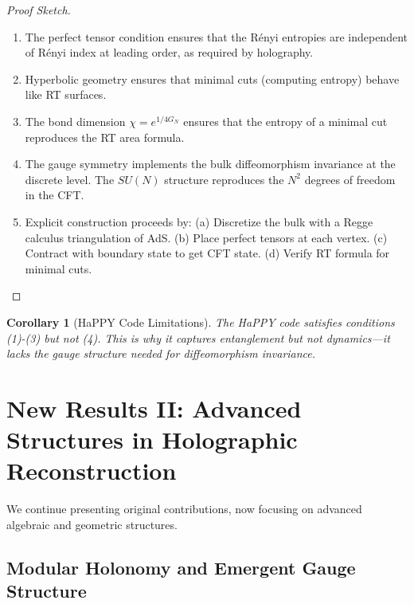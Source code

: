 \documentclass[12pt,a4paper]{article}
\newtheorem{corollary}[theorem]{Corollary}
\begin{document}
\begin{proof}[Proof Sketch]
\begin{enumerate}
    \item The perfect tensor condition ensures that the R\'enyi entropies are independent of R\'enyi index at leading order, as required by holography.
    
    \item Hyperbolic geometry ensures that minimal cuts (computing entropy) behave like RT surfaces.
    
    \item The bond dimension $\chi = e^{1/4G_N}$ ensures that the entropy of a minimal cut reproduces the RT area formula.
    
    \item The gauge symmetry implements the bulk diffeomorphism invariance at the discrete level. The $SU(N)$ structure reproduces the $N^2$ degrees of freedom in the CFT.
    
    \item Explicit construction proceeds by: (a) Discretize the bulk with a Regge calculus triangulation of AdS. (b) Place perfect tensors at each vertex. (c) Contract with boundary state to get CFT state. (d) Verify RT formula for minimal cuts.
\end{enumerate}
\end{proof}

\begin{corollary}[HaPPY Code Limitations]
The HaPPY code satisfies conditions (1)-(3) but not (4). This is why it captures entanglement but not dynamics---it lacks the gauge structure needed for diffeomorphism invariance.
\end{corollary}

\section{New Results II: Advanced Structures in Holographic Reconstruction}

We continue presenting original contributions, now focusing on advanced algebraic and geometric structures.

\subsection{Modular Holonomy and Emergent Gauge Structure}
\end{document}

